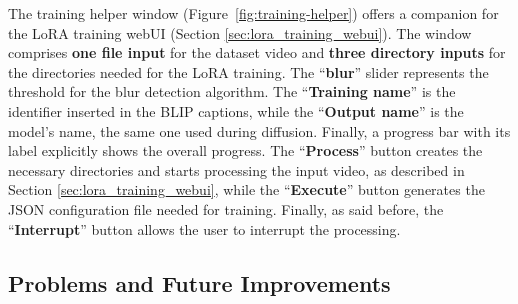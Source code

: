 \documentclass[preprint]{elsarticle}
\begin{document}
The training helper window (Figure~\ref{fig:training-helper}) offers a companion for the 
LoRA training webUI (Section \ref{sec:lora_training_webui}). 
The window comprises \textbf{one file input} for the dataset video and \textbf{three directory inputs} 
for the directories needed for the LoRA training. 
The ``\textbf{blur}'' slider represents the threshold for the blur detection algorithm. 
The ``\textbf{Training name}'' is the identifier inserted in the BLIP captions, 
while the ``\textbf{Output name}'' is the model's name, the same one used during diffusion. 
Finally, a progress bar with its label explicitly shows the overall progress.
The ``\textbf{Process}'' button creates the necessary directories and starts processing the 
input video, as described in Section \ref{sec:lora_training_webui}, while the ``\textbf{Execute}'' button generates the 
JSON configuration file needed for training.
Finally, as said before, the ``\textbf{Interrupt}'' button allows the user to interrupt the processing.



\subsection{Problems and Future Improvements}
\end{document}

